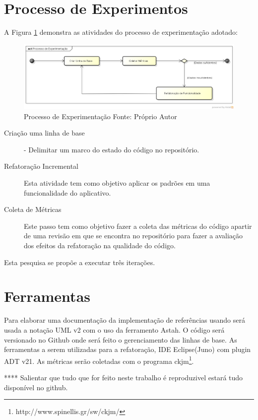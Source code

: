 \section{Processo de Experimentos}


A Figura \ref{processo_experimentacao} demonstra as atividades do processo de
experimentação adotado:
\begin{figure}[!h]
	\centering
	\includegraphics[scale=0.5]{img/processo_experimentacao.png}
	\caption{Processo de Experimentação Fonte: Próprio Autor}
	\label{processo_experimentacao}
\end{figure}

\begin{description}
\item[Criação uma linha de base] - Delimitar um marco do estado do código no
repositório.
\item[Refatoração Incremental] Esta atividade tem como objetivo aplicar os
padrões em uma funcionalidade do aplicativo.
\item[Coleta de Métricas] Este passo tem como objetivo fazer a coleta
das métricas do código apartir de uma revisão em que se encontra no repositório
para fazer a avaliação dos efeitos da refatoração na qualidade do código.
\end{description}

Esta pesquisa se propõe a executar três iterações.

\section{Ferramentas}

Para elaborar uma documentação da implementação de referências usando será usada
a notação UML v2 com o uso da ferramento Astah. O código será versionado no
Github onde será feito o gerenciamento das linhas de base. As ferramentas a
serem utilizadas para a refatoração, IDE Eclipse(Juno) com plugin ADT v21. As
métricas serão coletadas com o programa
ckjm\footnote{http://www.spinellis.gr/sw/ckjm/}.

**** Salientar que tudo que for feito neste trabalho é reproduzivel estará tudo
disponível no github.

